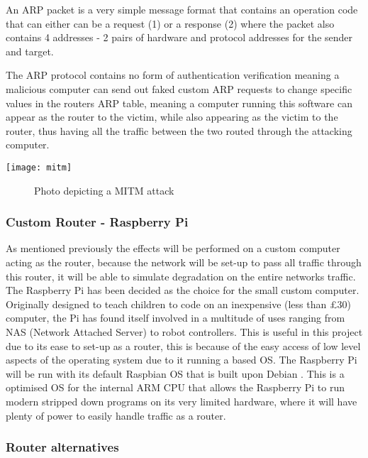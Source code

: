 An ARP packet is a very simple message format that contains an operation code that can either can be a request (1) or a response (2) where the packet also contains 4 addresses - 2 pairs of hardware and protocol addresses for the sender and target.

The ARP protocol contains no form of authentication verification meaning a malicious computer can send out faked custom ARP requests to change specific values in the routers ARP table, meaning a computer running this software can appear as the router to the victim, while also appearing as the victim to the router, thus having all the traffic between the two routed through the attacking computer. 

\begin{center}
\texttt{[image: mitm]}
	\begin{figure}[h]
		\caption{Photo depicting a MITM attack}
	\end{figure}
\end{center}

\subsubsection{Custom Router - Raspberry Pi}
As mentioned previously the effects will be performed on a custom computer acting as the router, because the network will be set-up to pass all traffic through this router, it will be able to simulate degradation on the entire networks traffic.
The Raspberry Pi \citep{upton2014raspberry} has been decided as the choice for the small custom computer. Originally designed to teach children to code on an inexpensive (less than £30) computer, the Pi has found itself involved in a multitude of uses ranging from NAS (Network Attached Server) to robot controllers. This is useful in this project due to its ease to set-up as a router, this is because of the easy access of low level aspects of the operating system due to it running a based OS. The Raspberry Pi will be run with its default Raspbian OS \citep{pi2014raspbian} that is built upon Debian \citep{murdock1994overview}. This is a optimised OS for the internal ARM CPU that allows the Raspberry Pi to run modern stripped down programs on its very limited hardware, where it will have plenty of power to easily handle traffic as a router.

\subsubsection{Router alternatives}

